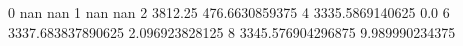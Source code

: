 0 nan nan
1 nan nan
2 3812.25 476.6630859375
4 3335.5869140625 0.0
6 3337.683837890625 2.096923828125
8 3345.576904296875 9.989990234375

